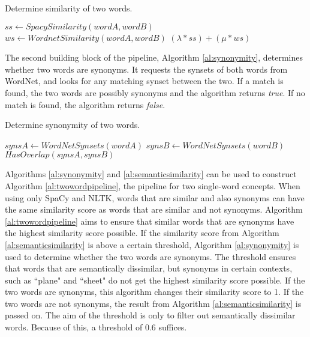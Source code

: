 \documentclass{article}
\begin{document}
\begin{algorithm}
\caption{Determine similarity of two words.}\label{al:semanticsimilarity}
\begin{algorithmic}[1]
		\State $\textit{ss} \gets \textit{SpacySimilarity}(wordA, wordB)$
		\State $\textit{ws} \gets \textit{WordnetSimilarity}(wordA, wordB)$
		\State \Return $(\lambda*ss)+(\mu*ws)$
	\EndProcedure
\end{algorithmic}
\end{algorithm}

The second building block of the pipeline, Algorithm \ref{al:synonymity}, determines whether two words are synonyms. It requests the synsets of both words from WordNet, and looks for any matching synset between the two. If a match is found, the two words are possibly synonyms and the algorithm returns \textit{true}. If no match is found, the algorithm returns \textit{false}.

\begin{algorithm}
\caption{Determine synonymity of two words.}\label{al:synonymity}
\begin{algorithmic}[1]
		\State $\textit{synsA} \gets \textit{WordNetSynsets}(wordA)$
		\State $\textit{synsB} \gets \textit{WordNetSynsets}(wordB)$
		\State \Return $\textit{HasOverlap}(synsA, synsB)$
	\EndProcedure
\end{algorithmic}
\end{algorithm}

Algorithms \ref{al:synonymity} and \ref{al:semanticsimilarity} can be used to construct Algorithm \ref{al:twowordpipeline}, the pipeline for two single-word concepts.  When using only SpaCy and NLTK, words that are similar and also synonyms can have the same similarity score as words that are similar and not synonyms. Algorithm \ref{al:twowordpipeline} aims to ensure that similar words that are synonyms have the highest similarity score possible. If the similarity score from Algorithm \ref{al:semanticsimilarity} is above a certain threshold, Algorithm \ref{al:synonymity} is used to determine whether the two words are synonyms. The threshold ensures that words that are semantically dissimilar, but synonyms in certain contexts, such as ``plane" and ``sheet" do not get the highest similarity score possible. If the two words are synonyms, this algorithm changes their similarity score to 1. If the two words are not synonyms, the result from Algorithm \ref{al:semanticsimilarity} is passed on. The aim of the threshold is only to filter out semantically dissimilar words. Because of this, a threshold of 0.6 suffices.
\end{document}
